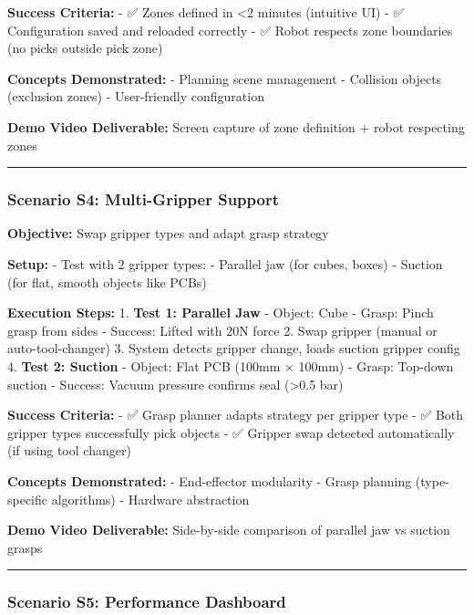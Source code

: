 \documentclass[
]{article}
\begin{document}
\textbf{Success Criteria:} - ✅ Zones defined in \textless2 minutes
(intuitive UI) - ✅ Configuration saved and reloaded correctly - ✅
Robot respects zone boundaries (no picks outside pick zone)

\textbf{Concepts Demonstrated:} - Planning scene management - Collision
objects (exclusion zones) - User-friendly configuration

\textbf{Demo Video Deliverable:} Screen capture of zone definition +
robot respecting zones

\begin{center}\rule{0.5\linewidth}{0.5pt}\end{center}

\hypertarget{scenario-s4-multi-gripper-support}{%
\subsubsection{Scenario S4: Multi-Gripper
Support}\label{scenario-s4-multi-gripper-support}}

\textbf{Objective:} Swap gripper types and adapt grasp strategy

\textbf{Setup:} - Test with 2 gripper types: - Parallel jaw (for cubes,
boxes) - Suction (for flat, smooth objects like PCBs)

\textbf{Execution Steps:} 1. \textbf{Test 1: Parallel Jaw} - Object:
Cube - Grasp: Pinch grasp from sides - Success: Lifted with 20N force 2.
Swap gripper (manual or auto-tool-changer) 3. System detects gripper
change, loads suction gripper config 4. \textbf{Test 2: Suction} -
Object: Flat PCB (100mm × 100mm) - Grasp: Top-down suction - Success:
Vacuum pressure confirms seal (\textgreater0.5 bar)

\textbf{Success Criteria:} - ✅ Grasp planner adapts strategy per
gripper type - ✅ Both gripper types successfully pick objects - ✅
Gripper swap detected automatically (if using tool changer)

\textbf{Concepts Demonstrated:} - End-effector modularity - Grasp
planning (type-specific algorithms) - Hardware abstraction

\textbf{Demo Video Deliverable:} Side-by-side comparison of parallel jaw
vs suction grasps

\begin{center}\rule{0.5\linewidth}{0.5pt}\end{center}

\hypertarget{scenario-s5-performance-dashboard}{%
\subsubsection{Scenario S5: Performance
Dashboard}\label{scenario-s5-performance-dashboard}}
\end{document}
